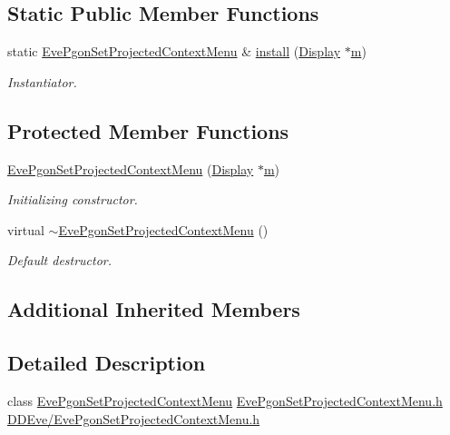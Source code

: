 \subsection*{Static Public Member Functions}
\begin{DoxyCompactItemize}
\item 
static \hyperlink{class_d_d4hep_1_1_eve_pgon_set_projected_context_menu}{Eve\+Pgon\+Set\+Projected\+Context\+Menu} \& \hyperlink{class_d_d4hep_1_1_eve_pgon_set_projected_context_menu_a1704c29806f07b92caf26bee83b69722}{install} (\hyperlink{class_d_d4hep_1_1_display}{Display} $\ast$\hyperlink{_volumes_8cpp_a6fc379aaec47ce424b00d8ffda2a6c59}{m})
\begin{DoxyCompactList}\small\item\em Instantiator. \end{DoxyCompactList}\end{DoxyCompactItemize}
\subsection*{Protected Member Functions}
\begin{DoxyCompactItemize}
\item 
\hyperlink{class_d_d4hep_1_1_eve_pgon_set_projected_context_menu_abb2c75b86df13a70ed20d3d14c7b6416}{Eve\+Pgon\+Set\+Projected\+Context\+Menu} (\hyperlink{class_d_d4hep_1_1_display}{Display} $\ast$\hyperlink{_volumes_8cpp_a6fc379aaec47ce424b00d8ffda2a6c59}{m})
\begin{DoxyCompactList}\small\item\em Initializing constructor. \end{DoxyCompactList}\item 
virtual \hyperlink{class_d_d4hep_1_1_eve_pgon_set_projected_context_menu_a2872930488e4ef2ef159f765acaea703}{$\sim$\+Eve\+Pgon\+Set\+Projected\+Context\+Menu} ()
\begin{DoxyCompactList}\small\item\em Default destructor. \end{DoxyCompactList}\end{DoxyCompactItemize}
\subsection*{Additional Inherited Members}


\subsection{Detailed Description}
class \hyperlink{class_d_d4hep_1_1_eve_pgon_set_projected_context_menu}{Eve\+Pgon\+Set\+Projected\+Context\+Menu} \hyperlink{_eve_pgon_set_projected_context_menu_8h}{Eve\+Pgon\+Set\+Projected\+Context\+Menu.\+h} \hyperlink{_eve_pgon_set_projected_context_menu_8h}{D\+D\+Eve/\+Eve\+Pgon\+Set\+Projected\+Context\+Menu.\+h} 

